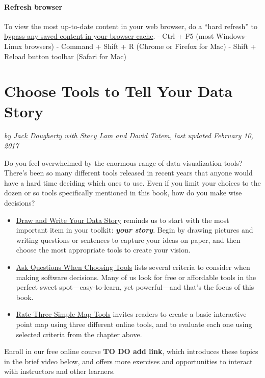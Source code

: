 \documentclass[
  english,
]{book}
\providecommand{\tightlist}{%
  \setlength{\itemsep}{0pt}\setlength{\parskip}{0pt}}
\begin{document}
\hypertarget{refresh-browser}{%
\subsubsection*{Refresh browser}\label{refresh-browser}}

To view the most up-to-date content in your web browser, do a ``hard refresh'' to \href{https://en.wikipedia.org/wiki/Wikipedia:Bypass_your_cache}{bypass any saved content in your browser cache}.
- Ctrl + F5 (most Windows-Linux browsers)
- Command + Shift + R (Chrome or Firefox for Mac)
- Shift + Reload button toolbar (Safari for Mac)

\hypertarget{choose}{%
\chapter{Choose Tools to Tell Your Data Story}\label{choose}}

\emph{by \href{authors}{Jack Dougherty with Stacy Lam and David Tatem}, last updated February 10, 2017}

Do you feel overwhelmed by the enormous range of data visualization tools? There's been so many different tools released in recent years that anyone would have a hard time deciding which ones to use. Even if you limit your choices to the dozen or so tools specifically mentioned in this book, how do you make wise decisions?

\begin{itemize}
\tightlist
\item
  \href{draw}{Draw and Write Your Data Story} reminds us to start with the most important item in your toolkit: \textbf{\emph{your story}}. Begin by drawing pictures and writing questions or sentences to capture your ideas on paper, and then choose the most appropriate tools to create your vision.
\item
  \href{ask}{Ask Questions When Choosing Tools} lists several criteria to consider when making software decisions. Many of us look for free or affordable tools in the perfect sweet spot---easy-to-learn, yet powerful---and that's the focus of this book.
\item
  \href{rate}{Rate Three Simple Map Tools} invites readers to create a basic interactive point map using three different online tools, and to evaluate each one using selected criteria from the chapter above.
\end{itemize}

Enroll in our free online course \textbf{TO DO add link}, which introduces these topics in the brief video below, and offers more exercises and opportunities to interact with instructors and other learners.
\end{document}
